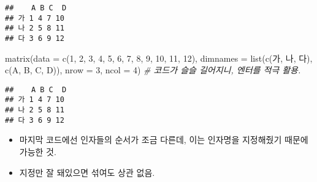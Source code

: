 \documentclass[
  12,
]{article}
\newenvironment{Shaded}{\begin{snugshade}}{\end{snugshade}}
\newcommand{\AttributeTok}[1]{\textcolor[rgb]{0.77,0.63,0.00}{#1}}
\newcommand{\CommentTok}[1]{\textcolor[rgb]{0.56,0.35,0.01}{\textit{#1}}}
\newcommand{\DecValTok}[1]{\textcolor[rgb]{0.00,0.00,0.81}{#1}}
\newcommand{\FunctionTok}[1]{\textcolor[rgb]{0.00,0.00,0.00}{#1}}
\newcommand{\NormalTok}[1]{#1}
\newcommand{\StringTok}[1]{\textcolor[rgb]{0.31,0.60,0.02}{#1}}
\begin{document}
\begin{verbatim}
##    A B C  D
## 가 1 4 7 10
## 나 2 5 8 11
## 다 3 6 9 12
\end{verbatim}

\begin{Shaded}
\begin{Highlighting}[]
\FunctionTok{matrix}\NormalTok{(}\AttributeTok{data =} \FunctionTok{c}\NormalTok{(}\DecValTok{1}\NormalTok{, }\DecValTok{2}\NormalTok{, }\DecValTok{3}\NormalTok{, }\DecValTok{4}\NormalTok{, }\DecValTok{5}\NormalTok{, }\DecValTok{6}\NormalTok{, }\DecValTok{7}\NormalTok{, }\DecValTok{8}\NormalTok{, }\DecValTok{9}\NormalTok{, }\DecValTok{10}\NormalTok{, }\DecValTok{11}\NormalTok{, }\DecValTok{12}\NormalTok{),}
       \AttributeTok{dimnames =} \FunctionTok{list}\NormalTok{(}\FunctionTok{c}\NormalTok{(}\StringTok{\textquotesingle{}가\textquotesingle{}}\NormalTok{, }\StringTok{\textquotesingle{}나\textquotesingle{}}\NormalTok{, }\StringTok{\textquotesingle{}다\textquotesingle{}}\NormalTok{), }\FunctionTok{c}\NormalTok{(}\StringTok{\textquotesingle{}A\textquotesingle{}}\NormalTok{, }\StringTok{\textquotesingle{}B\textquotesingle{}}\NormalTok{, }\StringTok{\textquotesingle{}C\textquotesingle{}}\NormalTok{, }\StringTok{\textquotesingle{}D\textquotesingle{}}\NormalTok{)),}
       \AttributeTok{nrow =} \DecValTok{3}\NormalTok{, }\AttributeTok{ncol =} \DecValTok{4}\NormalTok{) }\CommentTok{\# 코드가 슬슬 길어지니, 엔터를 적극 활용.}
\end{Highlighting}
\end{Shaded}

\begin{verbatim}
##    A B C  D
## 가 1 4 7 10
## 나 2 5 8 11
## 다 3 6 9 12
\end{verbatim}

\begin{itemize}
\item
  마지막 코드에선 인자들의 순서가 조금 다른데, 이는 인자명을 지정해줬기
  때문에 가능한 것.
\item
  지정만 잘 돼있으면 섞여도 상관 없음.
\end{itemize}
\end{document}
